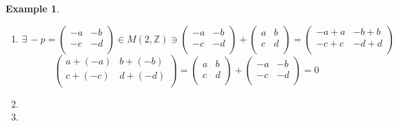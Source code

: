 \documentclass[11pt,a4paper]{article}
\theoremstyle{definition}
\newtheorem{exa}[thm]{Example}
\begin{document}
\begin{exa}
\begin{enumerate}
\begin{enumerate}
      
      \item[(iv)] $\exists\, -p = \begin{pmatrix}
      -a & -b\\
      -c & -d\\
      \end{pmatrix}\in M(2,\mathbb{Z})\ni \begin{pmatrix}
      -a & -b\\
      -c & -d\\
      \end{pmatrix} + \begin{pmatrix}
      a & b\\
      c & d\\
      \end{pmatrix} = \begin{pmatrix}
      -a + a & -b + b\\
      -c + c & -d + d\\
      \end{pmatrix}$
      $$\begin{pmatrix}
      a + (-a) & b + (-b)\\
      c + (-c) & d + (-d)\\
      \end{pmatrix} = \begin{pmatrix}
      a & b\\
      c & d\\
      \end{pmatrix} + \begin{pmatrix}
      -a & -b\\
      -c & -d\\
      \end{pmatrix} = 0$$
      
      \item[(v)]
      
      \item[(vi)]
\end{enumerate}




\end{enumerate}
\end{exa}
\end{document}
